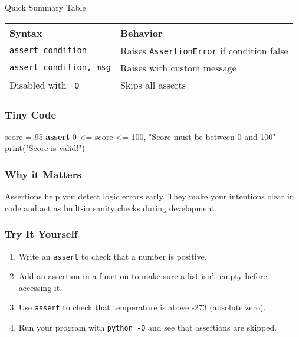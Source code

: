 \documentclass[
  letterpaper,
  DIV=11,
  numbers=noendperiod]{scrreprt}
\newenvironment{Shaded}{\begin{snugshade}}{\end{snugshade}}
\newcommand{\BuiltInTok}[1]{\textcolor[rgb]{0.00,0.23,0.31}{#1}}
\newcommand{\ControlFlowTok}[1]{\textcolor[rgb]{0.00,0.23,0.31}{\textbf{#1}}}
\newcommand{\DecValTok}[1]{\textcolor[rgb]{0.68,0.00,0.00}{#1}}
\newcommand{\NormalTok}[1]{\textcolor[rgb]{0.00,0.23,0.31}{#1}}
\newcommand{\OperatorTok}[1]{\textcolor[rgb]{0.37,0.37,0.37}{#1}}
\newcommand{\StringTok}[1]{\textcolor[rgb]{0.13,0.47,0.30}{#1}}
\providecommand{\tightlist}{%
  \setlength{\itemsep}{0pt}\setlength{\parskip}{0pt}}
\begin{document}
Quick Summary Table

\begin{longtable}[]{@{}ll@{}}
\toprule\noalign{}
Syntax & Behavior \\
\midrule\noalign{}
\endhead
\bottomrule\noalign{}
\endlastfoot
\texttt{assert\ condition} & Raises \texttt{AssertionError} if condition
false \\
\texttt{assert\ condition,\ msg} & Raises with custom message \\
Disabled with \texttt{-O} & Skips all asserts \\
\end{longtable}

\subsubsection{Tiny Code}\label{tiny-code-78}

\begin{Shaded}
\begin{Highlighting}[]
\NormalTok{score }\OperatorTok{=} \DecValTok{95}
\ControlFlowTok{assert} \DecValTok{0} \OperatorTok{\textless{}=}\NormalTok{ score }\OperatorTok{\textless{}=} \DecValTok{100}\NormalTok{, }\StringTok{"Score must be between 0 and 100"}
\BuiltInTok{print}\NormalTok{(}\StringTok{"Score is valid!"}\NormalTok{)}
\end{Highlighting}
\end{Shaded}

\subsubsection{Why it Matters}\label{why-it-matters-78}

Assertions help you detect logic errors early. They make your intentions
clear in code and act as built-in sanity checks during development.

\subsubsection{Try It Yourself}\label{try-it-yourself-78}

\begin{enumerate}
\def\labelenumi{\arabic{enumi}.}
\tightlist
\item
  Write an \texttt{assert} to check that a number is positive.
\item
  Add an assertion in a function to make sure a list isn't empty before
  accessing it.
\item
  Use \texttt{assert} to check that temperature is above -273 (absolute
  zero).
\item
  Run your program with \texttt{python\ -O} and see that assertions are
  skipped.
\end{enumerate}
\end{document}
